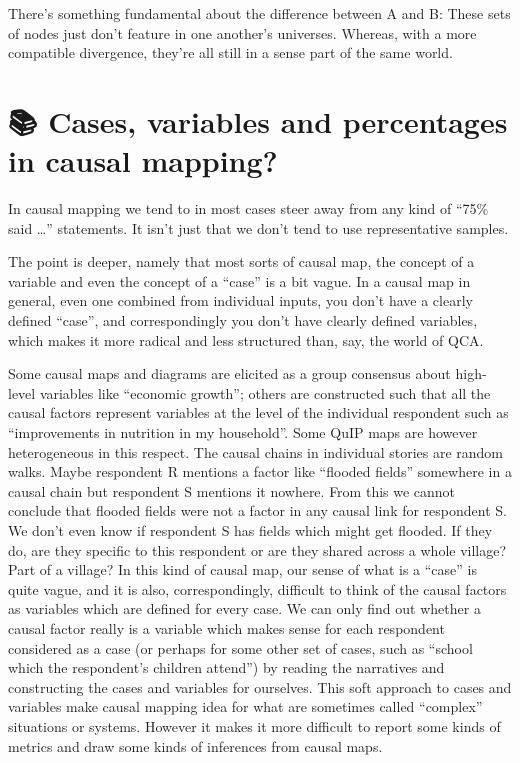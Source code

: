 \documentclass[
]{book}
\begin{document}
There's something fundamental about the difference between A and B: These sets of nodes just don't feature in one another's universes. Whereas, with a more compatible divergence, they're all still in a sense part of the same world.

\hypertarget{caveat-numbers}{%
\chapter{📚 Cases, variables and percentages in causal mapping?}\label{caveat-numbers}}

In causal mapping we tend to in most cases steer away from any kind of ``75\% said \ldots{}'' statements. It isn't just that we don't tend to use representative samples.

The point is deeper, namely that most sorts of causal map, the concept of a variable and even the concept of a ``case'' is a bit vague. In a causal map in general, even one combined from individual inputs, you don't have a clearly defined ``case'', and correspondingly you don't have clearly defined variables, which makes it more radical and less structured than, say, the world of QCA.

Some causal maps and diagrams are elicited as a group consensus about high-level variables like ``economic growth''; others are constructed such that all the causal factors represent variables at the level of the individual respondent such as ``improvements in nutrition in my household''. Some QuIP maps are however heterogeneous in this respect. The causal chains in individual stories are random walks. Maybe respondent R mentions a factor like ``flooded fields'' somewhere in a causal chain but respondent S mentions it nowhere. From this we cannot conclude that flooded fields were not a factor in any causal link for respondent S. We don't even know if respondent S has fields which might get flooded. If they do, are they specific to this respondent or are they shared across a whole village? Part of a village? In this kind of causal map, our sense of what is a ``case'' is quite vague, and it is also, correspondingly, difficult to think of the causal factors as variables which are defined for every case. We can only find out whether a causal factor really is a variable which makes sense for each respondent considered as a case (or perhaps for some other set of cases, such as ``school which the respondent's children attend'') by reading the narratives and constructing the cases and variables for ourselves.
This soft approach to cases and variables make causal mapping idea for what are sometimes called ``complex'' situations or systems. However it makes it more difficult to report some kinds of metrics and draw some kinds of inferences from causal maps.
\end{document}
